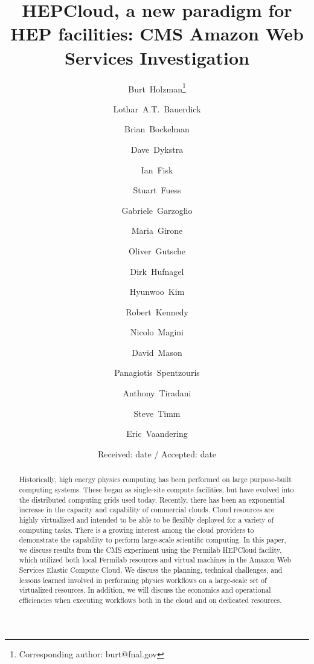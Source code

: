 \documentclass[twocolumn]{svjour3}          %
\begin{document}
\title{HEPCloud, a new paradigm for HEP facilities: CMS Amazon Web Services Investigation}

\author{Burt~Holzman\thanks{Corresponding author: burt@fnal.gov} \and Lothar~A.T.~Bauerdick \and Brian~Bockelman \and Dave~Dykstra \and Ian~Fisk \and Stuart~Fuess \and Gabriele~Garzoglio \and Maria~Girone \and Oliver~Gutsche \and Dirk~Hufnagel \and Hyunwoo~Kim \and Robert~Kennedy \and Nicolo~Magini \and David~Mason \and Panagiotis~Spentzouris \and Anthony~Tiradani \and Steve~Timm \and Eric~Vaandering}


\date{Received: date / Accepted: date}

\maketitle

\begin{abstract}
Historically, high energy physics computing has been performed on large purpose-built computing systems. These began as single-site compute facilities, but
have evolved into the distributed computing grids used today. Recently, there has been an exponential increase in the capacity and capability of
commercial clouds. Cloud resources are highly virtualized and intended to be able to be flexibly deployed for a variety of computing tasks.
There is a growing interest among the cloud providers to demonstrate the capability to perform large-scale scientific computing.
In this paper, we discuss results from the CMS experiment using the Fermilab HEPCloud facility,
which utilized both local Fermilab resources and virtual machines in the Amazon Web Services Elastic Compute Cloud.
We discuss the planning, technical challenges, and lessons learned involved
in performing physics workflows on a large-scale set of virtualized resources. In addition, we will discuss the economics and operational efficiencies
when executing workflows both in the cloud and on dedicated resources.


\end{abstract}
\end{document}
